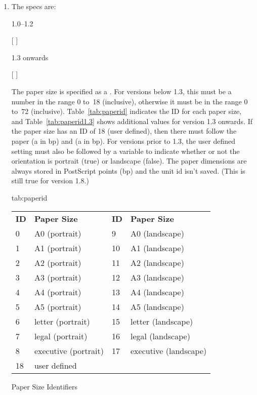 \begin{numbered}
\begin{enumerate}
  \item\label{jdr:paper}The  specs are:
  \begin{jdrversion}{1.0--1.2}
  \begin{syntaxline}
   [  ]
  \end{syntaxline}
  \end{jdrversion}
  \begin{jdrversion}{1.3 onwards}
  \begin{syntaxline}
   [ ]
  \end{syntaxline}
  \end{jdrversion}
  The paper size  is specified as a .
  For versions below 1.3, this must be a number in the range 0 to~18
  (inclusive), otherwise it must be in the range 0 to~72 (inclusive).
  Table~\ref{tab:paperid} indicates the ID for each paper size,
  and Table~\ref{tab:paperid1.3} shows additional values for version
  1.3 onwards.  If the paper size has an ID of 18 (user defined), then there
  must follow the paper  (a  in \gls{bp})
  and  (a  in \gls{bp}). For versions prior to 1.3,
  the user defined setting must also be followed by
   a  variable to indicate
  whether or not the orientation is portrait (true) or
  landscape (false). The paper dimensions are always stored
  in PostScript points (\gls{bp}) and the unit id isn't saved.
  (This is still true for version 1.8.)

\FloatTable
{tab:paperid}
{%
  \begin{tabular}{llll}
  \bfseries ID & \bfseries Paper Size &
  \bfseries ID & \bfseries Paper Size\\
  0 & A0 (portrait) & 9 & A0 (landscape)\\
  1 & A1 (portrait) & 10 & A1 (landscape)\\
  2 & A2 (portrait) & 11 & A2 (landscape)\\
  3 & A3 (portrait) & 12 & A3 (landscape)\\
  4 & A4 (portrait) & 13 & A4 (landscape)\\
  5 & A5 (portrait) & 14 & A5 (landscape)\\
  6 & letter (portrait) & 15 & letter (landscape)\\
  7 & legal (portrait) & 16 & legal (landscape)\\
  8 & executive (portrait) & 17 & executive (landscape)\\
  18 & user defined
  \end{tabular}
}
{Paper Size Identifiers}


\end{enumerate}
\end{numbered}
